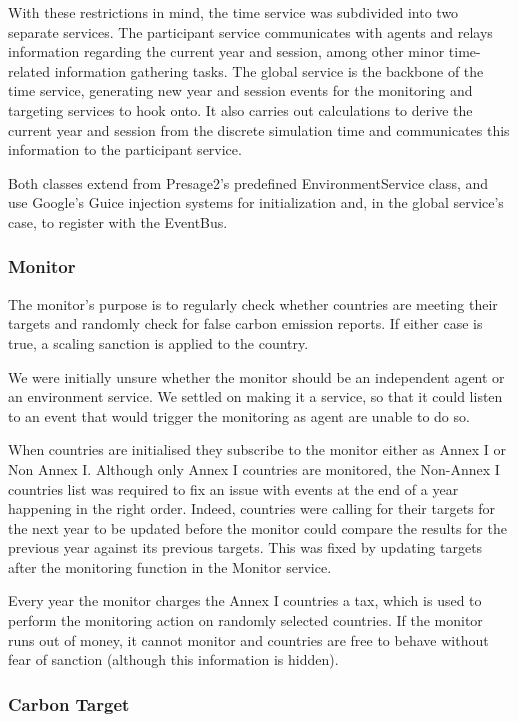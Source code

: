 \documentclass[]{article} %
\begin{document}
With these restrictions in mind, the time service was subdivided into two separate services.   The participant service communicates with agents and relays information regarding the current year and session, among other minor time-related information gathering tasks. The global service is the backbone of the time service, generating new year and session events for the monitoring and targeting services to hook onto. It also carries out calculations to derive the current year and session from the discrete simulation time and communicates this information to the participant service.

Both classes extend from Presage2’s predefined EnvironmentService class, and use Google’s Guice injection systems for initialization and, in the global service’s case, to register with the EventBus.

\subsubsection{Monitor}

The monitor’s purpose is to regularly check whether countries are meeting their targets and randomly check for false carbon emission reports. If either case is true, a scaling sanction is applied to the country.

We were initially unsure whether the monitor should be an independent agent or an environment service. We settled on making it a service, so that it could listen to an event that would trigger the monitoring as agent are unable to do so.

When countries are initialised they subscribe to the monitor either as Annex I or Non Annex I. Although only Annex I countries are monitored, the Non-Annex I countries list was required to fix an issue with events at the end of a year happening in the right order. Indeed, countries were calling for their targets for the next year to be updated before the monitor could compare the results for the previous year against its previous targets. This was fixed by updating targets after the monitoring function in the Monitor service.

Every year the monitor charges the Annex I countries a tax, which is used to perform the monitoring action on randomly selected countries. If the monitor runs out of money, it cannot monitor and countries are free to behave without fear of sanction (although this information is hidden).

\subsubsection{Carbon Target}
\end{document}
